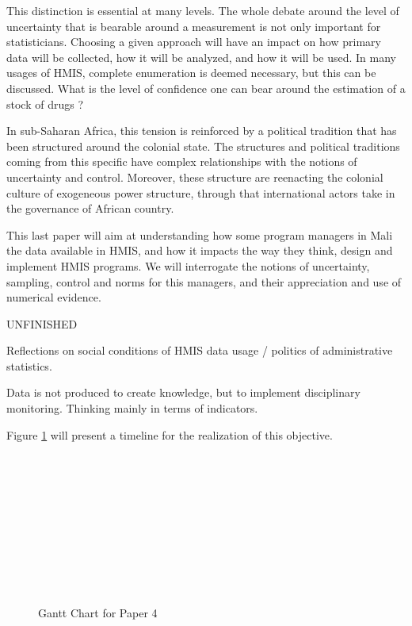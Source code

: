 \documentclass[a4paper,11pt,draft,twoside]{article}
\begin{document}
This distinction is essential at many levels. The whole debate around the level of uncertainty that is bearable around a measurement is not only important for statisticians. Choosing a given approach will have an impact on how primary data will be collected, how it will be analyzed, and how it will be used. In many usages of HMIS, complete enumeration is deemed necessary, but this can be discussed. What is the level of confidence one can bear around the estimation of a stock of drugs ?

In sub-Saharan Africa, this tension is reinforced by a political tradition that has been structured around the colonial state. The structures and political traditions coming from this specific have complex relationships with the notions of uncertainty and control. Moreover, these structure are reenacting the colonial culture of exogeneous power structure, through that international actors take in the governance of African country.

This last paper will aim at understanding how some program managers in Mali the data available in HMIS, and how it impacts the way they think, design and implement HMIS programs. We will interrogate the notions of uncertainty, sampling, control and norms for this managers, and their appreciation and use of numerical evidence.

UNFINISHED

Reflections on social conditions of HMIS data usage  / politics of administrative statistics.

Data is not produced to create knowledge, but to implement disciplinary monitoring. Thinking mainly in terms of indicators.


    Figure \ref{Gantt4} will present a timeline for the realization of this objective.

    \begin{figure}[h]
    \begin{ganttchart}{1}{24}
     \\
     \\
     \\
     \\
     \\
     \\
     \\
     \\
     \\
    \end{ganttchart}
    \caption{Gantt Chart for Paper 4}
    \label{Gantt4}
    \end{figure}


\newpage

\end{document}
